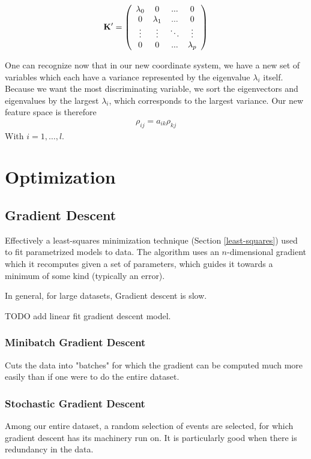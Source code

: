 $$\bf{K}' = \left(
{\begin{array}{cccc}
\lambda_0 & 0 &...&0 \\
0 & \lambda_1 & ...&0\\
\vdots & \vdots &\ddots & \vdots \\
0 & 0 & ... &\lambda_p
\end{array}}
\right)
$$

One can recognize now that in our new coordinate system, we have a new set of variables which each have a variance represented by the eigenvalue $\lambda_i$ itself. Because we want the most discriminating variable, we sort the eigenvectors and eigenvalues by the largest $\lambda_i$, which corresponds to the largest variance. Our new feature space is therefore
\begin{align}
	\rho_{ij} = a_{ik}\rho_{kj}
\end{align}
With $i=1,\dots,l$.

\section{Optimization}

\subsection{Gradient Descent}
Effectively a least-squares minimization technique (Section \ref{least-squares}) used to fit parametrized models to data. The algorithm uses an $n$-dimensional gradient which it recomputes given a set of parameters, which guides it towards a minimum of some kind (typically an error). 

In general, for large datasets, Gradient descent is slow.

TODO add linear fit gradient descent model.

\subsubsection{Minibatch Gradient Descent}
Cuts the data into "batches" for which the gradient can be computed much more easily than if one were to do the entire dataset.

\subsubsection{Stochastic Gradient Descent}
Among our entire dataset, a random selection of events are selected, for which gradient descent has its machinery run on. It is particularly good when there is redundancy in the data.

